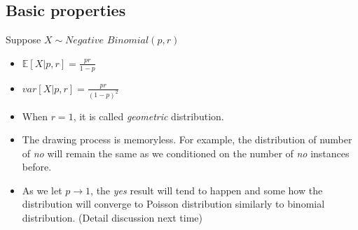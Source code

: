 \documentclass[../Distributions.tex]{subfiles}
\begin{document}
\subsection{Basic properties}
Suppose $X\sim\textit{Negative Binomial}(p,r)$
\begin{itemize}
	\item $\mathbb{E}[X|p,r] = \frac{pr}{1-p}$
	\item $var[X|p,r]=\frac{pr}{(1-p)^2}$
	\item When $r=1$, it is called {\it geometric} distribution.
	\item The drawing process is memoryless. For example, the distribution of number of {\it no} will remain the same as we conditioned on the number of {\it no} instances before.
	\item As we let $p\rightarrow1$, the {\it yes} result will tend to happen and some how the distribution will converge to Poisson distribution similarly to binomial distribution. (Detail discussion next time)
\end{itemize}
\end{document}
